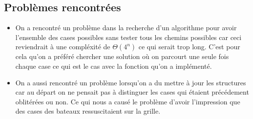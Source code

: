 \subsection{Problèmes rencontrées}
\begin{itemize}
\item On a rencontré un problème dans la recherche d'un algorithme pour avoir l'ensemble des cases possibles sans tester tous les chemins possibles car ceci reviendrait à une compléxité de $\Theta(4^n)$ ce qui serait trop long. C'est pour cela qu'on a préféré chercher une solution où on parcourt une seule fois chaque case ce qui est le cas avec la fonction qu'on a implémenté.\\
\item On a aussi rencontré un problème lorsqu'on a du mettre à jour les structures car au départ on ne pensait pas à distinguer les cases qui étaient précédement oblitérées ou non. Ce qui nous a causé le problème d'avoir l'impression que des cases des bateaux ressuscitaient sur la grille.
\end{itemize}


 
